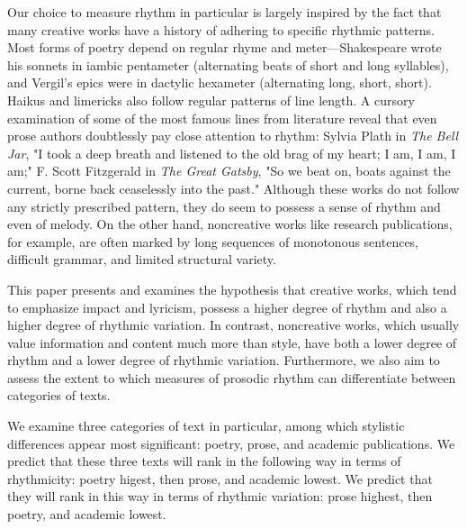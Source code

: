 \documentclass[pageno]{jpaper}
\begin{document}
Our choice to measure rhythm in particular is largely inspired by the fact that many creative works have a history of adhering to specific rhythmic patterns. Most forms of poetry depend on regular rhyme and meter---Shakespeare wrote his sonnets in iambic pentameter (alternating beats of short and long syllables), and Vergil's epics were in dactylic hexameter (alternating long, short, short). Haikus and limericks also follow regular patterns of line length. A cursory examination of some of the most famous lines from literature reveal that even prose authors doubtlessly pay close attention to rhythm: Sylvia Plath in \textit{The Bell Jar}, "I took a deep breath and listened to the old brag of my heart; I am, I am, I am;" F. Scott Fitzgerald in \textit{The Great Gatsby}, "So we beat on, boats against the current, borne back ceaselessly into the past." Although these works do not follow any strictly prescribed pattern, they do seem to possess a sense of rhythm and even of melody. On the other hand, noncreative works like research publications, for example, are often marked by long sequences of monotonous sentences, difficult grammar, and limited structural variety. 

This paper presents and examines the hypothesis that creative works, which tend to emphasize impact and lyricism, possess a higher degree of rhythm and also a higher degree of rhythmic variation. In contrast, noncreative works, which usually value information and content much more than style, have both a lower degree of rhythm and a lower degree of rhythmic variation. Furthermore, we also aim to assess the extent to which measures of prosodic rhythm can differentiate between categories of texts.  

We examine three categories of text in particular, among which stylistic differences appear most significant: poetry, prose, and academic publications. We predict that these three texts will rank in the following way in terms of rhythmicity: poetry higest, then prose, and academic lowest. We predict that they will rank in this way in terms of rhythmic variation: prose highest, then poetry, and academic lowest.
\end{document}
